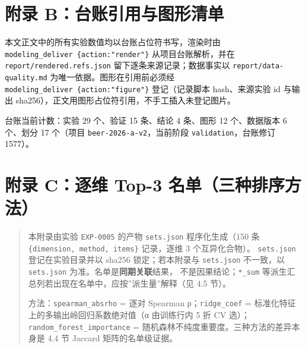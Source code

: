 \documentclass[
  11pt,
]{ctexart}
\begin{document}
\section{附录
B：台账引用与图形清单}\label{ux9644ux5f55-bux53f0ux8d26ux5f15ux7528ux4e0eux56feux5f62ux6e05ux5355}

本文正文中的所有实验数值均以台账占位符书写，渲染时由
\texttt{modeling\_deliver\ \{action:"render"\}} 从项目台账解析，并在
\texttt{report/\allowbreak{}rendered.\allowbreak{}refs.\allowbreak{}json} 留下逐条来源记录；数据事实以
\texttt{report/\allowbreak{}data-quality.\allowbreak{}md} 为唯一依据。图形在引用前必须经
\texttt{modeling\_deliver\ \{action:"figure"\}} 登记（记录脚本
hash、来源实验 id 与输出
sha256），正文用图形占位符引用，不手工插入未登记图片。

台账当前计数：实验 29 个、验证 15 条、结论 4 条、图形 12 个、数据版本 6
个、划分 17 个（项目 \texttt{beer-2026-a-v2}，当前阶段
\texttt{validation}，台账修订 1577）。

\section{附录 C：逐维 Top-3
名单（三种排序方法）}\label{ux9644ux5f55-cux9010ux7ef4-top-3-ux540dux5355ux4e09ux79cdux6392ux5e8fux65b9ux6cd5}

\begin{quote}
本附录由实验 \texttt{EXP-0005} 的产物 \texttt{sets.json} 程序化生成（150
条 \texttt{\{dimension,\ method,\ items\}} 记录，逐维 3 个互异化合物）。
\texttt{sets.json} 登记在实验目录并以 sha256 锁定；若本附录与
\texttt{sets.json} 不一致，以 \texttt{sets.json}
为准。名单是\textbf{同期关联}结果， 不是因果结论；\texttt{*\_sum}
等派生汇总列若出现在名单中，应按''派生量''解释（见 4.5 节）。

方法：\texttt{spearman\_\allowbreak{}absrho} = 逐对 \textbar Spearman
ρ\textbar；\texttt{ridge\_coef} =
标准化特征上的多输出岭回归系数绝对值（α 由训练行内 5 折 CV 选）；
\texttt{random\_\allowbreak{}forest\_\allowbreak{}importance} =
随机森林不纯度重要度。三种方法的差异本身是 4.4 节 Jaccard
矩阵的名单级证据。
\end{quote}
\end{document}
